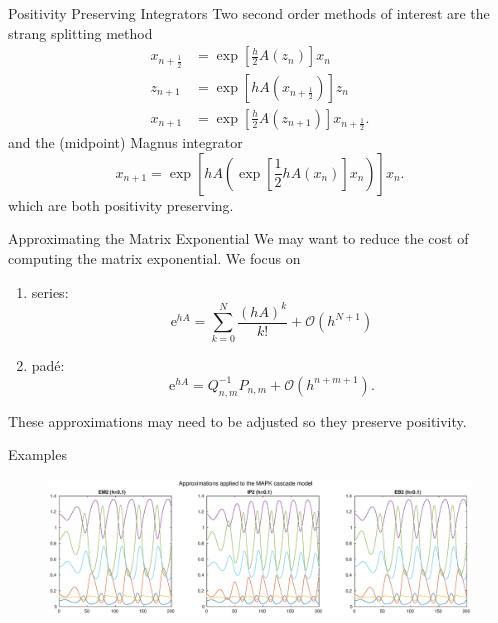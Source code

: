 \documentclass[aspectratio=169]{beamer}
\begin{document}
\begin{frame}{Positivity Preserving Integrators}
	Two second order methods of interest are \pause the strang splitting method
	\begin{equation*}
		\begin{aligned}
			x_{n+\frac{1}{2}} &= \exp \left[ \frac{h}{2} A(z_n) \right] x_n \\
			z_{n+1} &= \exp \left[ h A(x_{n+\frac{1}{2}}) \right] z_n \\
			x_{n+1} &= \exp \left[ \frac{h}{2} A(z_{n+1}) \right] x_{n+\frac{1}{2}}.
		\end{aligned}
		\label{eqn:secondorderstrangsplittingmethod}
	\end{equation*} \pause
	and the (midpoint) Magnus integrator
	\begin{equation*}
		x_{n+1} = \exp\left[h A \left( \exp\left[\frac{1}{2}h A(x_n)\right] x_n \right) \right] x_n.
		\label{eqn:secondordermagnus}
	\end{equation*}
	which are both positivity preserving.
\end{frame}

\begin{frame}{Approximating the Matrix Exponential}
	We may want to reduce the cost of computing the matrix exponential. \pause
	We focus on
	\begin{enumerate}
		\item<2-> series: $$\mathrm{e}^{hA} = \sum_{k=0}^{N} \frac{(hA)^k}{k!} + \mathcal{O}(h^{N+1})$$
		\item<3-> pad\'e: $$\mathrm{e}^{hA} = Q_{n,m}^{-1} P_{n,m} + \mathcal{O}(h^{n+m+1}).$$
	\end{enumerate}\pause[4]
	These approximations may need to be adjusted so they preserve positivity.
\end{frame}

\begin{frame}{Examples}
	\begin{figure}
		\centering
		\includegraphics[width=\linewidth]{Matlab/magnustriplemapk.eps}
		\label{fig:triplemagnus}
	\end{figure}
\end{frame}
\end{document}
